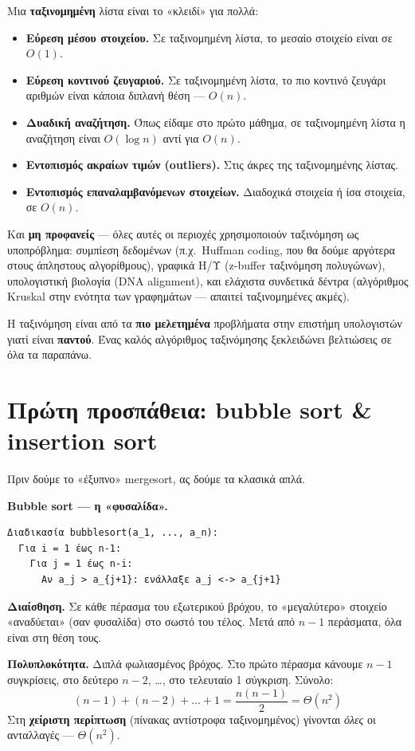 \documentclass[11pt,a4paper]{article}
\begin{document}
Μια \textbf{ταξινομημένη} λίστα είναι το «κλειδί» για πολλά:
\begin{itemize}
  \item \textbf{Εύρεση μέσου στοιχείου.} Σε ταξινομημένη λίστα, το μεσαίο
  στοιχείο είναι σε $O(1)$.
  \item \textbf{Εύρεση κοντινού ζευγαριού.} Σε ταξινομημένη λίστα, το πιο κοντινό
  ζευγάρι αριθμών είναι κάποια διπλανή θέση --- $O(n)$.
  \item \textbf{Δυαδική αναζήτηση.} Όπως είδαμε στο πρώτο μάθημα, σε ταξινομημένη
  λίστα η αναζήτηση είναι $O(\log n)$ αντί για $O(n)$.
  \item \textbf{Εντοπισμός ακραίων τιμών (outliers).} Στις άκρες της
  ταξινομημένης λίστας.
  \item \textbf{Εντοπισμός επαναλαμβανόμενων στοιχείων.} Διαδοχικά στοιχεία ή ίσα
  στοιχεία, σε $O(n)$.
\end{itemize}

Και \textbf{μη προφανείς} --- όλες αυτές οι περιοχές χρησιμοποιούν ταξινόμηση ως
υποπρόβλημα: συμπίεση δεδομένων (π.χ.\ Huffman coding, που θα δούμε αργότερα στους
άπληστους αλγορίθμους), γραφικά Η/Υ (z-buffer ταξινόμηση πολυγώνων), υπολογιστική
βιολογία (DNA alignment), και ελάχιστα συνδετικά δέντρα (αλγόριθμος Kruskal στην
ενότητα των γραφημάτων --- απαιτεί ταξινομημένες ακμές).

\begin{intuition}
Η ταξινόμηση είναι από τα \textbf{πιο μελετημένα} προβλήματα στην επιστήμη
υπολογιστών γιατί είναι \textbf{παντού}. Ένας καλός αλγόριθμος ταξινόμησης
ξεκλειδώνει βελτιώσεις σε όλα τα παραπάνω.
\end{intuition}

\section{Πρώτη προσπάθεια: bubble sort \& insertion sort}

Πριν δούμε το «έξυπνο» mergesort, ας δούμε τα κλασικά απλά.

\begin{examplebox}
\textbf{Bubble sort --- η «φυσαλίδα».}
\begin{codebox}
\begin{verbatim}
Διαδικασία bubblesort(a_1, ..., a_n):
  Για i = 1 έως n-1:
    Για j = 1 έως n-i:
      Αν a_j > a_{j+1}: ενάλλαξε a_j <-> a_{j+1}
\end{verbatim}
\end{codebox}
\textbf{Διαίσθηση.} Σε κάθε πέρασμα του εξωτερικού βρόχου, το «μεγαλύτερο»
στοιχείο «αναδύεται» (σαν φυσαλίδα) στο σωστό του τέλος. Μετά από $n-1$
περάσματα, όλα είναι στη θέση τους.

\textbf{Πολυπλοκότητα.} Διπλά φωλιασμένος βρόχος. Στο πρώτο πέρασμα κάνουμε $n-1$
συγκρίσεις, στο δεύτερο $n-2$, \dots, στο τελευταίο 1 σύγκριση. Σύνολο:
\[
(n-1) + (n-2) + \dots + 1 = \frac{n(n-1)}{2} = \Theta(n^2)
\]
Στη \textbf{χείριστη περίπτωση} (πίνακας αντίστροφα ταξινομημένος) γίνονται
\textit{όλες} οι ανταλλαγές --- $\Theta(n^2)$.
\end{examplebox}
\end{document}
